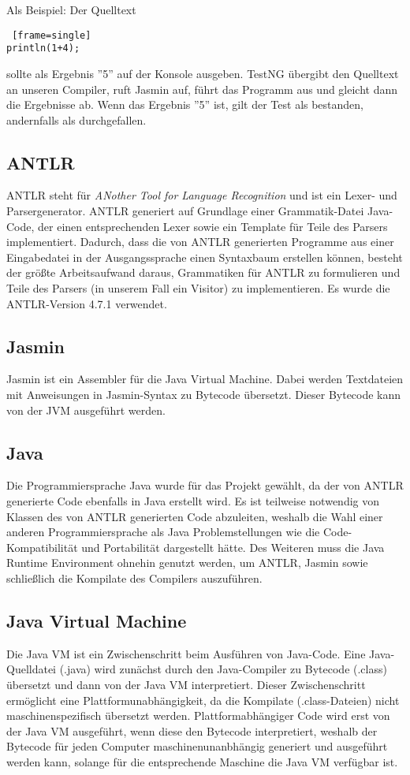 Als Beispiel: Der Quelltext
\begin{lstlisting} [frame=single]
println(1+4);
\end{lstlisting}

sollte als Ergebnis ''5'' auf der Konsole ausgeben. TestNG übergibt den Quelltext an unseren Compiler, ruft Jasmin auf, führt das Programm aus und gleicht dann die Ergebnisse ab. Wenn das Ergebnis ''5'' ist, gilt der Test als bestanden, andernfalls als durchgefallen. 

\subsection{ANTLR}
ANTLR steht für \textit{ANother Tool for Language Recognition} und ist ein Lexer- und Parsergenerator. ANTLR generiert auf Grundlage einer Grammatik-Datei Java-Code, der einen entsprechenden Lexer sowie ein Template für Teile des Parsers implementiert. Dadurch, dass die von ANTLR generierten Programme aus einer Eingabedatei in der Ausgangssprache einen Syntaxbaum erstellen können, besteht der größte Arbeitsaufwand daraus, Grammatiken für ANTLR zu formulieren und Teile des Parsers (in unserem Fall ein Visitor) zu implementieren. Es wurde die ANTLR-Version 4.7.1 verwendet.

\subsection{Jasmin}
Jasmin ist ein Assembler für die Java Virtual Machine. Dabei werden Textdateien mit Anweisungen in Jasmin-Syntax zu Bytecode übersetzt. Dieser Bytecode kann von der JVM ausgeführt werden.

\subsection{Java}
Die Programmiersprache Java wurde für das Projekt gewählt, da der von ANTLR generierte Code ebenfalls in Java erstellt wird. Es ist teilweise notwendig von Klassen des von ANTLR generierten Code abzuleiten, weshalb die Wahl einer anderen Programmiersprache als Java Problemstellungen wie die Code-Kompatibilität und Portabilität dargestellt hätte. 
Des Weiteren muss die Java Runtime Environment ohnehin genutzt werden, um ANTLR, Jasmin sowie schließlich die Kompilate des Compilers auszuführen.

\subsection{Java Virtual Machine}
Die Java VM ist ein Zwischenschritt beim Ausführen von Java-Code. Eine Java-Quelldatei (.java) wird zunächst durch den Java-Compiler zu Bytecode (.class) übersetzt und dann von der Java VM interpretiert. Dieser Zwischenschritt ermöglicht eine Plattformunabhängigkeit, da die Kompilate (.class-Dateien) nicht maschinenspezifisch übersetzt werden. Plattformabhängiger Code wird erst von der Java VM ausgeführt, wenn diese den Bytecode interpretiert, weshalb der Bytecode für jeden Computer maschinenunanbhängig generiert und ausgeführt werden kann, solange für die entsprechende Maschine die Java VM verfügbar ist.

